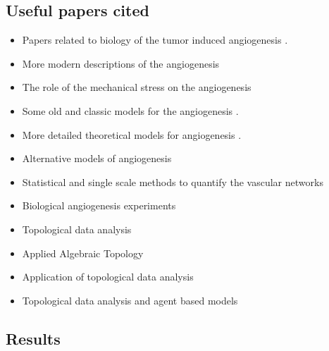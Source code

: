 \subsection{Useful papers cited}
\begin{itemize}
	\item Papers related to biology of the tumor induced angiogenesis \cite{Gupta2003,Folkman1971}.
	\item More modern descriptions of the angiogenesis \cite{Lugano2020,Saman2020}
	\item The role of the mechanical stress on the angiogenesis \cite{Li2005,Li2002,Vavourakis2017}
	\item Some old and classic models for the angiogenesis \cite{Anderson1998,Balding1985,Byrne1995,Stokes1991}.
	\item More detailed theoretical models for angiogenesis \cite{Byrne2010,Hadjicharalambous2021,Metzcar2019,Scianna2013}.
	\item Alternative models of angiogenesis \cite{Vilanova2017,Stepanova2021,Perfahl2017,Grogan2017,Vavourakis2017,Cai2017,Sefidgar2015}
	\item Statistical and single scale methods to quantify the vascular networks \cite{Perfahl2017,Folarin2010,Kannan2018,Konerding1999,Konerding2001}
	\item Biological angiogenesis experiments \cite{Bauer2007}
	\item Topological data analysis \cite{Carlsson2009,Zomorodian2005}
	\item Applied Algebraic Topology \cite{2020,2023}
	\item Application of topological data analysis \cite{Nicolau2011,Nielson2015,Qaiser2016,Xia2014}
	\item Topological data analysis and agent based models \cite{Topaz2015,McGuirl2020}
\end{itemize}




\subsection{Results}




	
	
	

\let\section\oldsection
